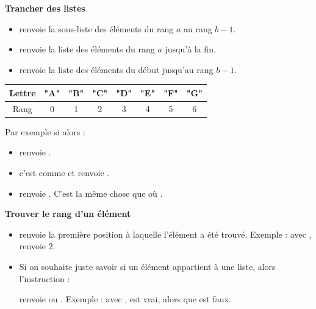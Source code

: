 \documentclass[11pt,class=report,crop=false]{standalone}
\begin{document}
\bigskip
    
\textbf{Trancher des listes}
  
  \begin{itemize}
    \item {} \quad renvoie la sous-liste des éléments du rang $a$ au rang $b-1$.
    
    \item {} \quad renvoie la liste des éléments du rang $a$ jusqu'à la fin.
      
    \item {} \quad renvoie la liste des éléments du début jusqu'au rang $b-1$.
    

\end{itemize}


\medskip
 \begin{center}
\begin{tabular}{|c||c|c|c|c|c|c|c|}
\hline
Lettre & \textbf{"A"} & \textbf{"B"} & \textbf{"C"} & \textbf{"D"} & \textbf{"E"} & \textbf{"F"} & \textbf{"G"} \\ \hline
Rang & 0 & 1 & 2 & 3 & 4 & 5 & 6 \\ \hline
\end{tabular}
\end{center}
\medskip
  
    Par exemple si  alors :
  \begin{itemize}
    \item {} \quad renvoie \ci{["B","C","D"]}.
    \item {} \quad c'est comme  et renvoie \ci{["A","B"]}.   
    \item {} \quad renvoie \ci{["E","F","G"]}.  C'est la même chose 
     que  où .
  \end{itemize} 

\bigskip

\textbf{Trouver le rang d'un élément} 

\begin{itemize}

    \item   
    renvoie la première position à laquelle l'élément a été trouvé. Exemple : avec ,
    renvoie $2$.

  \item Si on souhaite juste savoir si un élément appartient à une liste, alors l'instruction :\\
  \centerline{}  
  renvoie  ou .
  Exemple : avec ,
   \og{}\fg{} est vrai, alors que \og{}\fg{} est faux.
  
\end{itemize}
\end{document}
